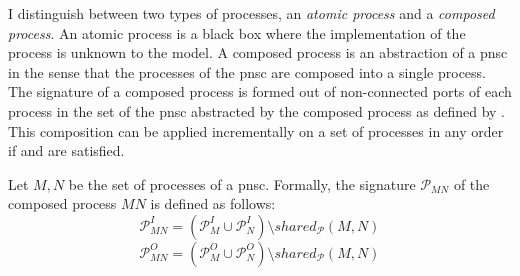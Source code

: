 I distinguish between two types of processes, an \emph{atomic process} and a \emph{composed process}.
An atomic process is a black box where the implementation of the process is unknown to the model.
A composed process is an abstraction of a \gls{pnsc} in the sense that the processes of the \gls{pnsc} are composed into a single process.
The signature of a composed process is formed out of non-connected ports of each process in the set of the \gls{pnsc} abstracted by the composed process as defined by \Def{\ref{def_proc_composed}}.
This composition can be applied incrementally on a set of processes in any order if \Equ{\ref{eq_conflict_port_in}} and \Equ{\ref{eq_conflict_port_out}} are satisfied.

\begin{definition}
    \label{def_proc_composed}
    Let ${M, N}$ be the set of processes of a \gls{pnsc}.
    Formally, the signature $\mathcal{P}_{\mathit{MN}}$ of the composed process $\mathit{MN}$ is defined as follows:
    \begin{displaymath}
        \mathcal{P}_{\mathit{MN}}^I = (\mathcal{P}_M^I \cup \mathcal{P}_N^I) \setminus shared_\mathcal{P}(M, N)
    \end{displaymath}
    \begin{displaymath}
        \mathcal{P}_{\mathit{MN}}^O = (\mathcal{P}^O_M \cup \mathcal{P}_N^O) \setminus shared_\mathcal{P}(M, N)
    \end{displaymath}
\end{definition}

